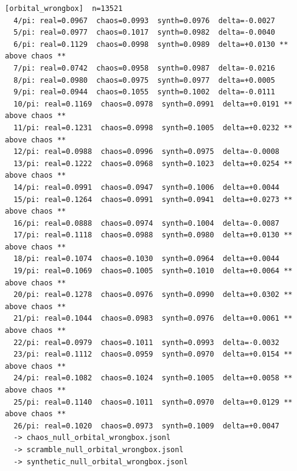 \documentclass[11pt, letterpaper, openany]{book}
\begin{document}
\begin{empiricalbox}
\begin{lstlisting}[style=terminal]
[orbital_wrongbox]  n=13521
  4/pi: real=0.0967  chaos=0.0993  synth=0.0976  delta=-0.0027
  5/pi: real=0.0977  chaos=0.1017  synth=0.0982  delta=-0.0040
  6/pi: real=0.1129  chaos=0.0998  synth=0.0989  delta=+0.0130 ** above chaos **
  7/pi: real=0.0742  chaos=0.0958  synth=0.0987  delta=-0.0216
  8/pi: real=0.0980  chaos=0.0975  synth=0.0977  delta=+0.0005
  9/pi: real=0.0944  chaos=0.1055  synth=0.1002  delta=-0.0111
  10/pi: real=0.1169  chaos=0.0978  synth=0.0991  delta=+0.0191 ** above chaos **
  11/pi: real=0.1231  chaos=0.0998  synth=0.1005  delta=+0.0232 ** above chaos **
  12/pi: real=0.0988  chaos=0.0996  synth=0.0975  delta=-0.0008
  13/pi: real=0.1222  chaos=0.0968  synth=0.1023  delta=+0.0254 ** above chaos **
  14/pi: real=0.0991  chaos=0.0947  synth=0.1006  delta=+0.0044
  15/pi: real=0.1264  chaos=0.0991  synth=0.0941  delta=+0.0273 ** above chaos **
  16/pi: real=0.0888  chaos=0.0974  synth=0.1004  delta=-0.0087
  17/pi: real=0.1118  chaos=0.0988  synth=0.0980  delta=+0.0130 ** above chaos **
  18/pi: real=0.1074  chaos=0.1030  synth=0.0964  delta=+0.0044
  19/pi: real=0.1069  chaos=0.1005  synth=0.1010  delta=+0.0064 ** above chaos **
  20/pi: real=0.1278  chaos=0.0976  synth=0.0990  delta=+0.0302 ** above chaos **
  21/pi: real=0.1044  chaos=0.0983  synth=0.0976  delta=+0.0061 ** above chaos **
  22/pi: real=0.0979  chaos=0.1011  synth=0.0993  delta=-0.0032
  23/pi: real=0.1112  chaos=0.0959  synth=0.0970  delta=+0.0154 ** above chaos **
  24/pi: real=0.1082  chaos=0.1024  synth=0.1005  delta=+0.0058 ** above chaos **
  25/pi: real=0.1140  chaos=0.1011  synth=0.0970  delta=+0.0129 ** above chaos **
  26/pi: real=0.1020  chaos=0.0973  synth=0.1009  delta=+0.0047
  -> chaos_null_orbital_wrongbox.jsonl
  -> scramble_null_orbital_wrongbox.jsonl
  -> synthetic_null_orbital_wrongbox.jsonl


\end{lstlisting}
\end{empiricalbox}
\end{document}
